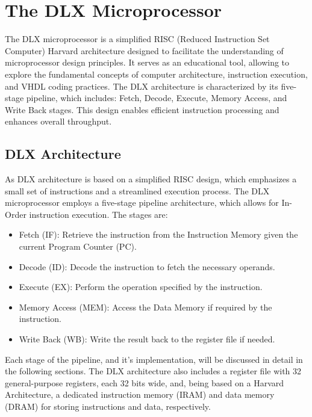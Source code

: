 \section{The DLX Microprocessor}
The DLX microprocessor is a simplified RISC (Reduced Instruction Set Computer) Harvard architecture designed to facilitate the understanding of microprocessor design principles. It serves as an educational tool, allowing to explore the fundamental concepts of computer architecture, instruction execution, and VHDL coding practices. The DLX architecture is characterized by its five-stage pipeline, which includes: Fetch, Decode, Execute, Memory Access, and Write Back stages. This design enables efficient instruction processing and enhances overall throughput.

\subsection{DLX Architecture}
As DLX architecture is based on a simplified RISC design, which emphasizes a small set of instructions and a streamlined execution process. The DLX microprocessor employs a five-stage pipeline architecture, which allows for In-Order instruction execution. The stages are:
\begin{itemize}
        \item Fetch (IF): Retrieve the instruction from the Instruction Memory given the current Program Counter (PC).
        \item Decode (ID): Decode the instruction to fetch the necessary operands.
        \item Execute (EX): Perform the operation specified by the instruction.
        \item Memory Access (MEM): Access the Data Memory if required by the instruction.
        \item Write Back (WB): Write the result back to the register file if needed.
\end{itemize}

Each stage of the pipeline, and it's implementation, will be discussed in detail in the following sections. The DLX architecture also includes a register file with 32 general-purpose registers, each 32 bits wide, and, being based on a Harvard Architecture, a dedicated instruction memory (IRAM) and data memory (DRAM) for storing instructions and data, respectively.

